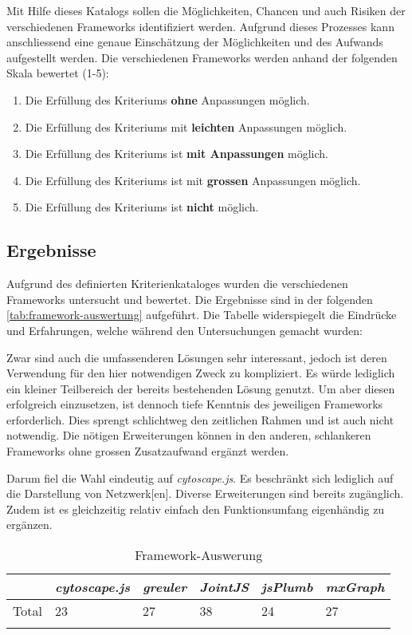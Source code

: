 Mit Hilfe dieses Katalogs sollen die Möglichkeiten, Chancen und auch Risiken der verschiedenen \gls{Framework}s identifiziert werden. Aufgrund dieses Prozesses kann anschliessend eine genaue Einschätzung der Möglichkeiten und des Aufwands aufgestellt werden. Die verschiedenen \gls{Framework}s werden anhand der folgenden Skala bewertet (1-5): 
\begin{enumerate}
  \item Die Erfüllung des Kriteriums \textbf{ohne} Anpassungen möglich.
  \item Die Erfüllung des Kriteriums mit \textbf{leichten} Anpassungen möglich.
  \item Die Erfüllung des Kriteriums ist \textbf{mit Anpassungen} möglich.
  \item Die Erfüllung des Kriteriums ist mit \textbf{grossen} Anpassungen mög\-lich.
  \item Die Erfüllung des Kriteriums ist \textbf{nicht} möglich.
\end{enumerate}

\subsection{Ergebnisse}
Aufgrund des definierten Kriterienkataloges wurden die verschiedenen \gls{Framework}s untersucht und bewertet. Die Ergebnisse sind in der folgenden \autoref{tab:framework-auswertung} aufgeführt. Die Tabelle widerspiegelt die Eindrücke und Erfahrungen, welche während den Untersuchungen gemacht wurden:

Zwar sind auch die umfassenderen Lösungen sehr interessant, jedoch ist deren Verwendung für den hier notwendigen Zweck zu kompliziert. Es würde lediglich ein kleiner Teilbereich der bereits bestehenden Lösung genutzt. Um aber diesen erfolgreich einzusetzen, ist dennoch tiefe Kenntnis des jeweiligen \gls{Framework}s erforderlich. Dies sprengt schlichtweg den zeitlichen Rahmen und ist auch nicht notwendig. Die nötigen Erweiterungen können in den anderen, schlankeren \gls{Framework}s ohne grossen Zusatzaufwand ergänzt werden.

Darum fiel die Wahl eindeutig auf \textit{cytoscape.js}. Es beschränkt sich lediglich auf die Darstellung von \gls{Netzwerk}[en]. Diverse Erweiterungen sind bereits zugänglich. Zudem ist es gleichzeitig relativ einfach den Funktionsumfang eigenhändig zu ergänzen.

\begin{longtable}{|p{0.8cm}| p{2.2cm} | p{1.5cm}| p{1.5cm}| p{2cm}| p{2cm}|}
  \hline
    & \textit{cytoscape.js} & \textit{greuler} &\textit{JointJS} &\textit{jsPlumb} &\textit{mxGraph}  \\\hline
    Total & 23 & 27 & 38 & 24 & 27\\\hline
    \caption{Framework-Auswerung}
  \label{tab:framework-auswertung}
\end{longtable}

